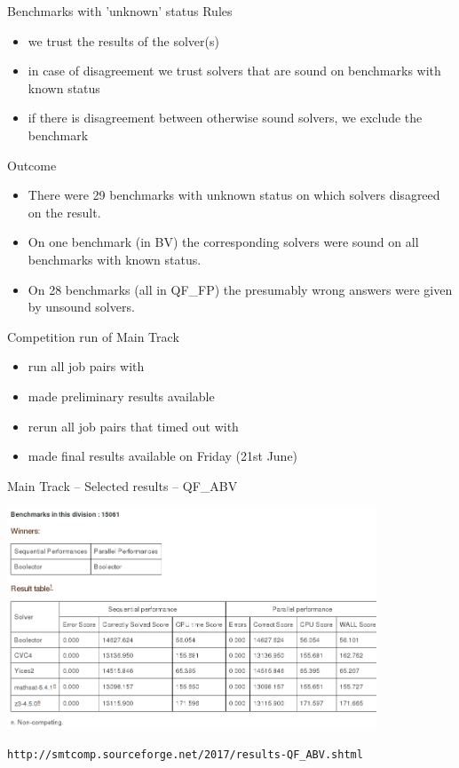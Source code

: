 \documentclass{beamer}
\begin{document}
\begin{frame}{Benchmarks with 'unknown' status}
Rules
\begin{itemize}
 \item we trust the results of the solver(s)
 \item in case of disagreement we trust solvers that are sound on benchmarks with known status
 \item if there is disagreement between otherwise sound solvers, we exclude the benchmark
\end{itemize}

\vfill
\pause

Outcome
\begin{itemize}
 \item There were 29 benchmarks with unknown status 
 on which solvers disagreed on the result.
 \item On one benchmark (in BV) the corresponding solvers were sound on all benchmarks with known status.
 \item On 28 benchmarks (all in QF\_FP) the presumably wrong answers were given by unsound solvers. 
\end{itemize}


\end{frame}



\begin{frame}{Competition run of Main Track}
\begin{itemize}
 \item run all job pairs with 
 \item made preliminary results available
 \item rerun all job pairs that timed out with 
 \item made final results available on Friday (21st June)
\end{itemize}

 
\end{frame}


\begin{frame}{Main Track -- Selected results -- QF\_ABV}

\includegraphics[width=11cm]{screenshots/Results-QF_ABV}

\texttt{\tiny http://smtcomp.sourceforge.net/2017/results-QF\_ABV.shtml}
\end{frame}
\end{document}
